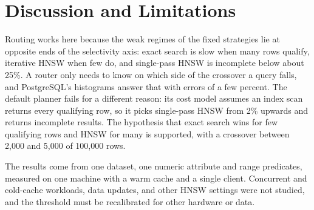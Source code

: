 \section{Discussion and Limitations}
\label{sec:discussion}

Routing works here because the weak regimes of the fixed strategies lie at opposite ends of the selectivity axis:
exact search is slow when many rows qualify, iterative HNSW when few do, and single-pass HNSW is incomplete below about
25\%. A router only needs to know on which side of the crossover a query falls, and PostgreSQL's histograms answer that
with errors of a few percent. The default planner fails for a different reason: its cost model assumes an index scan
returns every qualifying row, so it picks single-pass HNSW from 2\% upwards and returns incomplete results. The
hypothesis that exact search wins for few qualifying rows and HNSW for many is supported, with a crossover between
2{,}000 and 5{,}000 of 100{,}000 rows.

The results come from one dataset, one numeric attribute and range predicates, measured on one machine with a warm
cache and a single client. Concurrent and cold-cache workloads, data updates, and other HNSW settings were not
studied, and the threshold must be recalibrated for other hardware or data.
